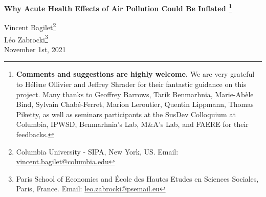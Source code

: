 \documentclass[12pt]{article}
\renewcommand{\thefootnote}{\fnsymbol{footnote}}
\begin{document}



\begin{titlepage}
\vspace*{-2cm}
\begin{flushleft}
\Huge{}\selectfont\textbf{Why Acute Health Effects of Air Pollution Could Be Inflated \footnote[2]{\textbf{Comments and suggestions are highly welcome.} We are very grateful to Hélène Ollivier and Jeffrey Shrader for their fantastic guidance on this project. Many thanks to Geoffrey Barrows, Tarik Benmarhnia, Marie-Abèle Bind, Sylvain Chabé-Ferret, Marion Leroutier, Quentin Lippmann, Thomas Piketty, as well as seminars participants at the SusDev Colloquium at Columbia, IPWSD, Benmarhnia's Lab,  M\&A's Lab, and FAERE for their feedbacks.}}
\end{flushleft}
\renewcommand{\thefootnote}{\arabic{footnote}}
\vspace*{0.1cm} 
\begin{flushleft}
{\large
Vincent Bagilet\footnote{Columbia University - SIPA, New York, US. Email: \url{vincent.bagilet@columbia.edu}}\\[3pt] 
Léo Zabrocki\footnote{Paris School of Economics and
École des Hautes Etudes en Sciences Sociales, Paris, France. Email: \url{leo.zabrocki@psemail.eu}}
\\ [0.3cm] 
\normalsize{November 1st, 2021} \\
}

\end{flushleft}



\end{titlepage}
\end{document}

